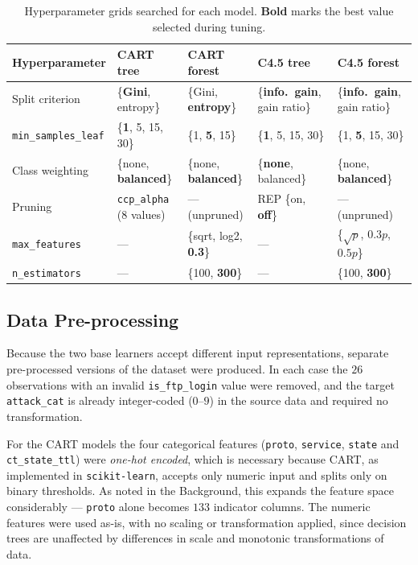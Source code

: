 \documentclass[conference]{IEEEtran}
\begin{document}
\begin{table}[!t]
\centering
\caption{Hyperparameter grids searched for each model. \textbf{Bold} marks the best value selected during tuning.}
\label{tab:grids}
\begin{tabular}{lllll}
\toprule
Hyperparameter & CART tree & CART forest & C4.5 tree & C4.5 forest \\
\midrule
Split criterion & \{\textbf{Gini}, entropy\} & \{Gini, \textbf{entropy}\} & \{\textbf{info.\ gain}, gain ratio\} & \{\textbf{info.\ gain}, gain ratio\} \\
\texttt{min\_samples\_leaf} & \{\textbf{1}, 5, 15, 30\} & \{1, \textbf{5}, 15\} & \{\textbf{1}, 5, 15, 30\} & \{1, \textbf{5}, 15, 30\} \\
Class weighting & \{none, \textbf{balanced}\} & \{none, \textbf{balanced}\} & \{\textbf{none}, balanced\} & \{none, \textbf{balanced}\} \\
Pruning & \texttt{ccp\_alpha} (8 values) & --- (unpruned) & REP \{on, \textbf{off}\} & --- (unpruned) \\
\texttt{max\_features} & --- & \{sqrt, log2, \textbf{0.3}\} & --- & \{$\sqrt{p}$, $0.3p$, {\boldmath$0.5p$}\} \\
\texttt{n\_estimators} & --- & \{100, \textbf{300}\} & --- & \{100, \textbf{300}\} \\
\bottomrule
\end{tabular}
\end{table}

\subsection{Data Pre-processing} %

Because the two base learners accept different input representations, separate
pre-processed versions of the dataset were produced.
In each case the $26$ observations with an invalid
\texttt{is\_ftp\_login} value were removed, and the target \texttt{attack\_cat} is already
integer-coded ($0$--$9$) in the source data and required no transformation.

For the CART models the four categorical features (\texttt{proto}, \texttt{service},
\texttt{state} and \texttt{ct\_state\_ttl}) were \emph{one-hot encoded}, which is necessary
because CART, as implemented in \texttt{scikit-learn}, accepts only numeric input and splits
only on binary thresholds. As noted in the Background, this expands the feature space
considerably --- \texttt{proto} alone becomes $133$ indicator columns. The numeric features
were used as-is, with no scaling or transformation applied, since decision trees are
unaffected by differences in scale and monotonic transformations of data.
\end{document}
